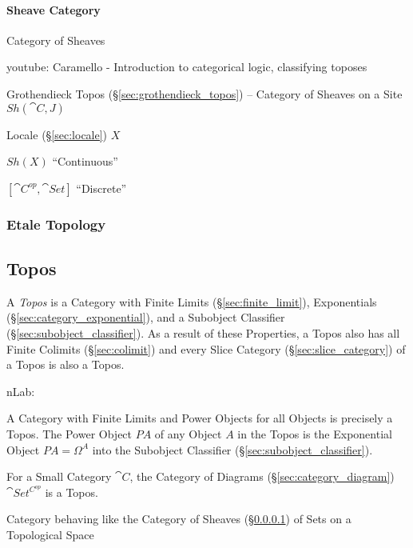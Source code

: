 \paragraph{Sheave Category}\label{sec:sheave_category}\hfill

Category of Sheaves

youtube: Caramello - Introduction to categorical logic, classifying
toposes

Grothendieck Topos (\S\ref{sec:grothendieck_topos}) -- Category of
Sheaves on a Site $Sh(\cat{C},J)$

Locale (\S\ref{sec:locale}) $X$

$Sh(X)$ ``Continuous''

$[\cat{C}^{op},\cat{Set}]$ ``Discrete''





\subsubsection{Etale Topology}\label{sec:etale_topology}



\subsection{Topos}\label{sec:topos}

A \emph{Topos} is a Category with Finite Limits
(\S\ref{sec:finite_limit}), Exponentials
(\S\ref{sec:category_exponential}), and a Subobject Classifier
(\S\ref{sec:subobject_classifier}). As a result of these Properties, a
Topos also has all Finite Colimits (\S\ref{sec:colimit}) and every
Slice Category (\S\ref{sec:slice_category}) of a Topos is also a
Topos.

nLab:

A Category with Finite Limits and Power Objects for all Objects is
precisely a Topos. The Power Object $P A$ of any Object $A$ in the
Topos is the Exponential Object $P A = \Omega^A$ into the Subobject
Classifier (\S\ref{sec:subobject_classifier}).

For a Small Category $\cat{C}$, the Category of Diagrams
(\S\ref{sec:category_diagram}) $\cat{Set^{C^{op}}}$ is a
Topos.\cite{awodey06}

Category behaving like the Category of Sheaves
(\S\ref{sec:sheave_category}) of Sets on a Topological Space

